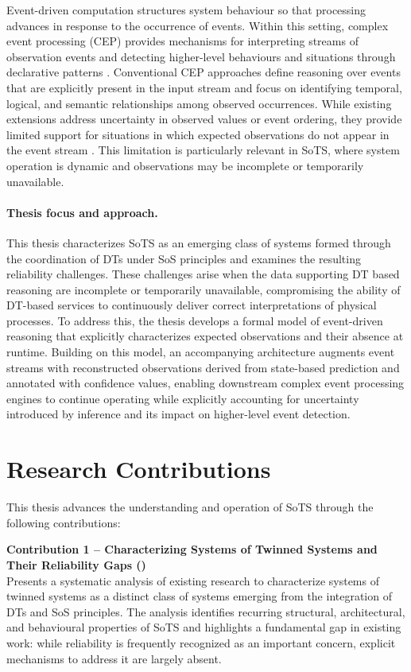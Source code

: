 Event-driven computation structures system behaviour so that processing advances in response to the occurrence of events. Within this setting, complex event processing (CEP) provides mechanisms for interpreting streams of observation events and detecting higher-level behaviours and situations through declarative patterns \citep{luckham2002power}. Conventional CEP approaches define reasoning over events that are explicitly present in the input stream and focus on identifying temporal, logical, and semantic relationships among observed occurrences. While existing extensions address uncertainty in observed values or event ordering, they provide limited support for situations in which expected observations do not appear in the event stream \citep{alevizos2017probabilistic}. This limitation is particularly relevant in SoTS, where system operation is dynamic and observations may be incomplete or temporarily unavailable.


\paragraph{Thesis focus and approach.}
This thesis characterizes SoTS as an emerging class of systems formed through the coordination of DTs under SoS principles and examines the resulting reliability challenges. These challenges arise when the data supporting DT based reasoning are incomplete or temporarily unavailable, compromising the ability of DT-based services to continuously deliver correct interpretations of physical processes. To address this, the thesis develops a formal model of event-driven reasoning that explicitly characterizes expected observations and their absence at runtime. Building on this model, an accompanying architecture augments event streams with reconstructed observations derived from state-based prediction and annotated with confidence values, enabling downstream complex event processing engines to continue operating while explicitly accounting for uncertainty introduced by inference and its impact on higher-level event detection.


\section*{Research Contributions}
This thesis advances the understanding and operation of SoTS through the following contributions:

\textbf{Contribution 1 – Characterizing Systems of Twinned Systems and Their Reliability Gaps ()} \\
Presents a systematic analysis of existing research to characterize systems of twinned systems as a distinct class of systems emerging from the integration of DTs and SoS principles. The analysis identifies recurring structural, architectural, and behavioural properties of SoTS and highlights a fundamental gap in existing work: while reliability is frequently recognized as an important concern, explicit mechanisms to address it are largely absent.


